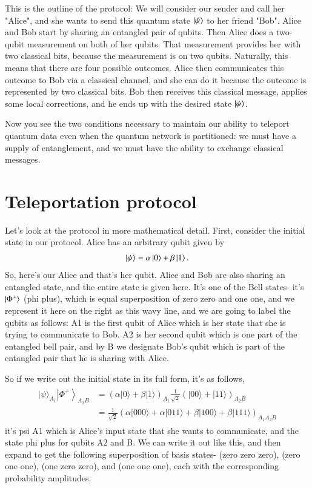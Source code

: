 This is the outline of the protocol: We will consider our sender and call her "Alice", and she wants to send this quantum state $\ket{\psi}$ to her friend "Bob".  Alice and Bob start by sharing an entangled pair of qubits. Then Alice does a two-qubit measurement on both of her qubits. That measurement provides her with two classical bits, because the measurement is on two qubits.  Naturally, this means that there are four possible outcomes. Alice then communicates this outcome to Bob via a classical channel, and she can do it because the outcome is represented by two classical bits.  Bob then receives this classical message, applies some local corrections, and he ends up with the desired state $\ket{\psi}$.  

Now you see the two conditions necessary to maintain our ability to teleport quantum data even when the quantum network is partitioned: we must have a supply of entanglement, and we must have the ability to exchange classical messages.

\section{Teleportation protocol}


Let's look at the protocol in more mathematical detail.  First, consider the initial state in our protocol. Alice has an arbitrary qubit given by
\begin{align}
    \ket{\psi} = \alpha\ket{0} + \beta\ket{1}.
\end{align}
So, here's our Alice and that's her qubit. Alice and Bob are also sharing an entangled state, and the entire state is given here. It's one of the Bell states- it's $\ket{\Phi^+}$ (phi plus), which is equal superposition of zero zero and one one, and we represent it here on the right as this wavy line, and we are going to label the qubits as follows: A1 is the first qubit of Alice which is her state that she is trying to communicate to Bob. A2 is her second qubit which is one part of the entangled bell pair, and by B we designate Bob's qubit which is part of the entangled pair that he is sharing with Alice.

So if we write out the initial state in its full form, it's as follows,
\begin{align}
    \begin{aligned}
|\psi\rangle_{A_{1}}\left|\Phi^{+}\right\rangle_{A_{2} B} &=(\alpha|0\rangle+\beta|1\rangle)_{A_{1}} \frac{1}{\sqrt{2}}(|00\rangle+|11\rangle)_{A_{2} B} \\
&=\frac{1}{\sqrt{2}}(\alpha|000\rangle+\alpha|011\rangle+\beta|100\rangle+\beta|111\rangle)_{A_{1} A_{2} B}
\end{aligned}
\end{align}
it's psi A1 which is Alice's input state that she wants to communicate, and the state phi plus for qubits A2 and B. We can write it out like this, and then expand to get the following superposition of basis states- (zero zero zero), (zero one one), (one zero zero), and (one one one), each with the corresponding probability amplitudes.

